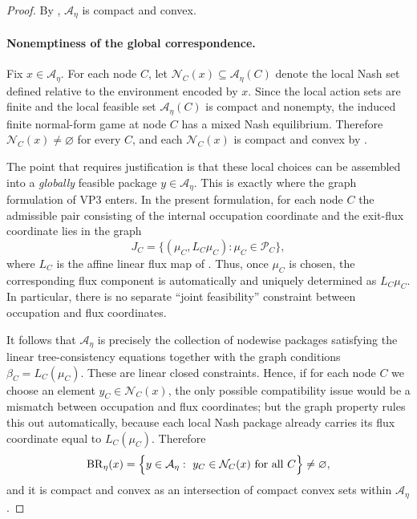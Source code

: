 \documentclass[12pt]{article}
\theoremstyle{definition}
\newcommand{\1}{\mathbf{1}}
\newcommand{\cA}{\mathcal{A}}
\newcommand{\cN}{\mathcal{N}}
\begin{document}
\begin{proof}
By , \(\cA_\eta\) is compact and convex.

\paragraph{Nonemptiness of the global correspondence.}
Fix \(x\in \cA_\eta\). For each node \(C\), let \(\cN_C(x)\subseteq \cA_\eta(C)\) denote the local Nash set defined relative to the environment encoded by \(x\). Since the local action sets are finite and the local feasible set \(\cA_\eta(C)\) is compact and nonempty, the induced finite normal-form game at node \(C\) has a mixed Nash equilibrium. Therefore \(\cN_C(x)\neq\varnothing\) for every \(C\), and each \(\cN_C(x)\) is compact and convex by .

The point that requires justification is that these local choices can be assembled into a \emph{globally} feasible package \(y\in \cA_\eta\). This is exactly where the graph formulation of VP3 enters. In the present formulation, for each node \(C\) the admissible pair consisting of the internal occupation coordinate and the exit-flux coordinate lies in the graph
\[
J_C=\{(\mu_C,L_C\mu_C):\mu_C\in \mathcal P_C\},
\]
where \(L_C\) is the affine linear flux map of . Thus, once \(\mu_C\) is chosen, the corresponding flux component is automatically and uniquely determined as \(L_C\mu_C\). In particular, there is no separate ``joint feasibility'' constraint between occupation and flux coordinates.

It follows that \(\cA_\eta\) is precisely the collection of nodewise packages satisfying the linear tree-consistency equations together with the graph conditions \(\beta_C=L_C(\mu_C)\). These are linear closed constraints. Hence, if for each node \(C\) we choose an element \(y_C\in \cN_C(x)\), the only possible compatibility issue would be a mismatch between occupation and flux coordinates; but the graph property rules this out automatically, because each local Nash package already carries its flux coordinate equal to \(L_C(\mu_C)\). Therefore
\[
\operatorname{BR}_\eta(x)
=
\Bigl\{y\in \cA_\eta:\ y_C\in \cN_C(x)\ \text{for all }C\Bigr\}
\neq\varnothing,
\]
and it is compact and convex as an intersection of compact convex sets within \(\cA_\eta\).


\end{proof}
\end{document}
